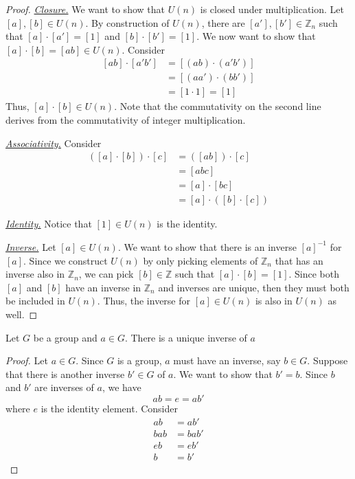 \begin{proof}
    \phantom{wow}

    \textit{\underline{Closure.}} We want to show that \(U(n)\) is closed under multiplication. Let \([a], [b] \in U(n)\). By construction of \(U(n)\), there are \([a'], [b'] \in \mathbb{Z}_n\) such that \([a] \cdot [a'] = [1]\) and \([b] \cdot [b'] = [1]\). We now want to show that \([a] \cdot [b] = [ab] \in U(n)\). Consider
    \[
    \begin{aligned}
        [ab] \cdot [a'b'] &= [(ab) \cdot (a'b')] \\
                          &= [(aa') \cdot (bb')] \\
                          &= [1 \cdot 1] = [1]
    \end{aligned}
    \]
    Thus, \([a] \cdot [b] \in U(n)\). Note that the commutativity on the second line derives from the commutativity of integer multiplication.

    \textit{\underline{Associativity.}} Consider
    \[
    \begin{aligned}
        ([a] \cdot [b]) \cdot [c] &= ([ab]) \cdot [c] \\
                                  &= [abc] \\
                                  &= [a] \cdot [bc] \\
                                  &= [a] \cdot ([b] \cdot [c])
    \end{aligned}
    \]

    \textit{\underline{Identity.}} Notice that \([1] \in U(n)\) is the identity.

    \textit{\underline{Inverse.}} Let \([a] \in U(n)\). We want to show that there is an inverse \([a]^{-1}\) for \([a]\). Since we construct \(U(n)\) by only picking elements of \(\mathbb{Z}_n\) that has an inverse also in \(\mathbb{Z}_n\), we can pick \([b] \in \mathbb{Z}\) such that \([a] \cdot [b] = [1]\). Since both \([a]\) and \([b]\) have an inverse in \(\mathbb{Z}_n\) and inverses are unique, then they must both be included in \(U(n)\). Thus, the inverse for \([a] \in U(n)\) is also in \(U(n)\) as well.
\end{proof}

\begin{theorem}
    Let \(G\) be a group and \(a \in G\). There is a unique inverse of \(a\)
\end{theorem}

\begin{proof}
    Let \(a \in G\). Since \(G\) is a group, \(a\) must have an inverse, say \(b \in G\). Suppose that there is another inverse \(b' \in G\) of \(a\). We want to show that \(b' = b\). Since \(b\) and \(b'\) are inverses of \(a\), we have
    \[
        ab = e = ab'
    \]
    where \(e\) is the identity element. Consider
    \[
    \begin{aligned}
        ab &= ab' \\
        bab &= bab' \\
        eb &= eb' \\
        b &= b'
    \end{aligned}
    \]
\end{proof}

